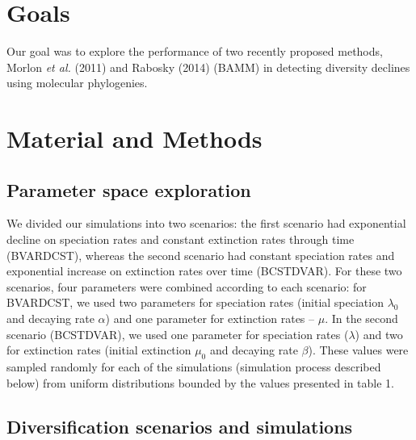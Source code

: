 \documentclass[11pt,]{article}
\begin{document}
\section{Goals}\label{goals}

Our goal was to explore the performance of two recently proposed
methods, Morlon \emph{et al.} (2011) and Rabosky (2014) (BAMM) in
detecting diversity declines using molecular phylogenies.

\section{Material and Methods}\label{material-and-methods}

\subsection{Parameter space
exploration}\label{parameter-space-exploration}

We divided our simulations into two scenarios: the first scenario had
exponential decline on speciation rates and constant extinction rates
through time (BVARDCST), whereas the second scenario had constant
speciation rates and exponential increase on extinction rates over time
(BCSTDVAR). For these two scenarios, four parameters were combined
according to each scenario: for BVARDCST, we used two parameters for
speciation rates (initial speciation \(\lambda_0\) and decaying rate
\(\alpha\)) and one parameter for extinction rates -- \(\mu\). In the
second scenario (BCSTDVAR), we used one parameter for speciation rates
(\(\lambda\)) and two for extinction rates (initial extinction \(\mu_0\)
and decaying rate \(\beta\)). These values were sampled randomly for
each of the simulations (simulation process described below) from
uniform distributions bounded by the values presented in table 1.

\subsection{Diversification scenarios and
simulations}\label{diversification-scenarios-and-simulations}
\end{document}
